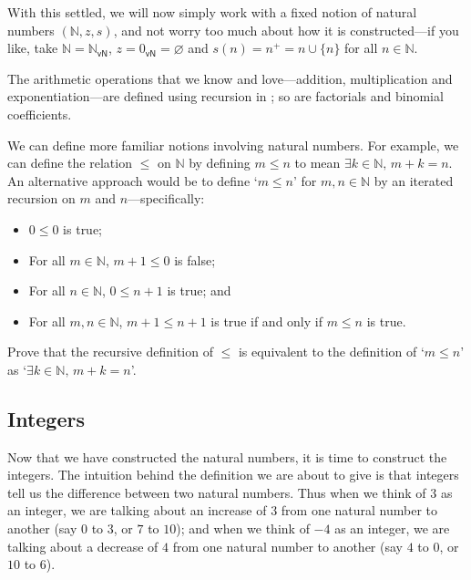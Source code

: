 With this settled, we will now simply work with a fixed notion of natural numbers $(\mathbb{N}, z, s)$, and not worry too much about how it is constructed---if you like, take $\mathbb{N} = \mathbb{N}_{\mathsf{vN}}$, $z = 0_{\mathsf{vN}} = \varnothing$ and $s(n) = n^+ = n \cup \{ n \}$ for all $n \in \mathbb{N}$.

The arithmetic operations that we know and love---addition, multiplication and exponentiation---are defined using recursion in ; so are factorials and binomial coefficients.

We can define more familiar notions involving natural numbers. For example, we can define the relation $\le$ on $\mathbb{N}$ by defining $m \le n$ to mean $\exists k \in \mathbb{N},\, m+k=n$. An alternative approach would be to define `$m \le n$' for $m,n \in \mathbb{N}$ by an iterated recursion on $m$ and $n$---specifically:
\begin{itemize}
\item $0 \le 0$ is true;
\item For all $m \in \mathbb{N}$, $m+1 \le 0$ is false;
\item For all $n \in \mathbb{N}$, $0 \le n+1$ is true; and
\item For all $m,n \in \mathbb{N}$, $m+1 \le n+1$ is true if and only if $m \le n$ is true.
\end{itemize}

\begin{exercise}
Prove that the recursive definition of $\le$ is equivalent to the definition of `$m \le n$' as `$\exists k \in \mathbb{N},\, m+k=n$'.
\end{exercise}

\subsection*{Integers}

Now that we have constructed the natural numbers, it is time to construct the integers. The intuition behind the definition we are about to give is that integers tell us the difference between two natural numbers. Thus when we think of $3$ as an integer, we are talking about an increase of $3$ from one natural number to another (say $0$ to $3$, or $7$ to $10$); and when we think of $-4$ as an integer, we are talking about a decrease of $4$ from one natural number to another (say $4$ to $0$, or $10$ to $6$).

